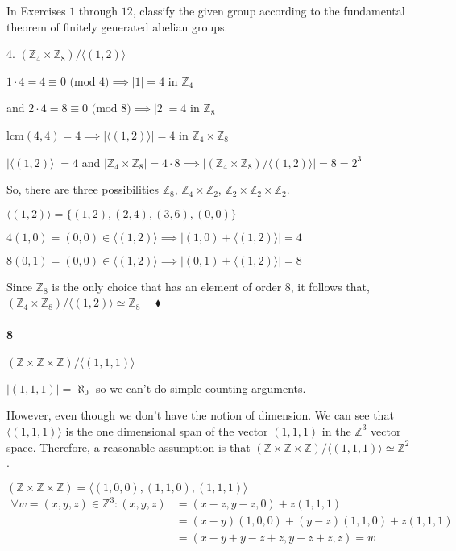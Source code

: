 \documentclass{article}
\newcommand\Z{\mathbb{Z}}
\begin{document}
In Exercises $1$ through $12$, classify the given group according to
the fundamental theorem of finitely generated abelian groups.

4. $(\Z_4\times \Z_8)/\langle (1,2) \rangle$

$1\cdot 4 = 4 \equiv 0 \text{ (mod $4$)}\implies |1| = 4$ in $\Z_4$

and
$2\cdot 4 = 8 \equiv 0 \text{ (mod $8$)}\implies |2| = 4$ in $\Z_8$

lcm$(4,4) = 4 \implies |\langle (1,2) \rangle| = 4$ in $\Z_4\times
\Z_8$

$|\langle (1,2) \rangle| = 4$  and $|\Z_4\times \Z_8| = 4\cdot 8
\implies |(\Z_4\times \Z_8)/\langle (1,2) \rangle| = 8= 2^3$

So, there are three possibilities $\Z_8$, $\Z_4\times \Z_2$, $\Z_2\times\Z_2\times\Z_2$.

$ \langle (1,2) \rangle = \{(1,2),(2,4),(3,6),(0,0)\}$

$4(1,0) = (0,0) \in \langle (1,2) \rangle \implies |(1,0)+\langle
(1,2) \rangle| = 4$

$8(0,1) = (0,0) \in \langle (1,2) \rangle \implies  |(0,1) + \langle
(1,2) \rangle| = 8$

Since $\Z_8$ is the only choice that has an element of order $8$, it
follows that,$(\Z_4\times \Z_8)/\langle (1,2) \rangle \simeq \Z_8$
$\quad \blacklozenge$

\paragraph{8} $(\Z\times\Z\times\Z)/\langle (1,1,1)  \rangle$


$|(1,1,1)|=\aleph_0$ so we can't do simple counting arguments.

However, even though we don't have the notion of dimension.
We can see that $\langle (1,1,1) \rangle$ is the one dimensional span of the vector $(1,1,1)$
in the $\Z^3$ vector space. Therefore, a reasonable assumption is that
$(\Z\times\Z\times\Z)/\langle (1,1,1)  \rangle \simeq \Z^2$.

$(\Z\times\Z\times \Z) = \langle (1,0,0),(1,1,0),(1,1,1) \rangle$
\begin{align*}
  \forall w = (x,y,z)\in \Z^3: (x, y, z) &= (x-z,y-z,0)+ z(1,1,1)\\
                                         &= (x-y)(1,0,0) +
                                           (y-z)(1,1,0) +z(1,1,1)\\
                                         &= (x-y+y-z+z,y-z+z,z) = w
\end{align*}
\end{document}
